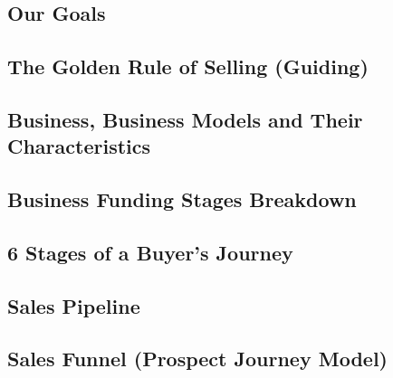 \subsection{Our Goals}

\subsection{The Golden Rule of Selling (Guiding)}

\subsection{Business, Business Models and Their Characteristics}

\subsection{Business Funding Stages Breakdown}

\subsection{6 Stages of a Buyer's Journey}

\subsection{Sales Pipeline}

\subsection{Sales Funnel (Prospect Journey Model)}


\printbibliography[heading=secbibliography, title={References}]